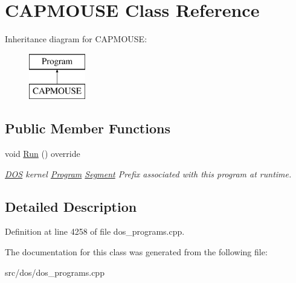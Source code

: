 \hypertarget{classCAPMOUSE}{\section{C\-A\-P\-M\-O\-U\-S\-E Class Reference}
\label{classCAPMOUSE}
}
Inheritance diagram for C\-A\-P\-M\-O\-U\-S\-E\-:\begin{figure}[H]
\begin{center}
\leavevmode
\includegraphics[height=2.000000cm]{classCAPMOUSE}
\end{center}
\end{figure}
\subsection*{Public Member Functions}
\begin{DoxyCompactItemize}
\item 
\hypertarget{classCAPMOUSE_a40f8a87bf9027081766fb5e0fc74149a}{void \hyperlink{classCAPMOUSE_a40f8a87bf9027081766fb5e0fc74149a}{Run} () override}\label{classCAPMOUSE_a40f8a87bf9027081766fb5e0fc74149a}

\begin{DoxyCompactList}\small\item\em \hyperlink{classDOS}{D\-O\-S} kernel \hyperlink{classProgram}{Program} \hyperlink{structSegment}{Segment} Prefix associated with this program at runtime. \end{DoxyCompactList}\end{DoxyCompactItemize}


\subsection{Detailed Description}


Definition at line 4258 of file dos\-\_\-programs.\-cpp.



The documentation for this class was generated from the following file\-:\begin{DoxyCompactItemize}
\item 
src/dos/dos\-\_\-programs.\-cpp\end{DoxyCompactItemize}
